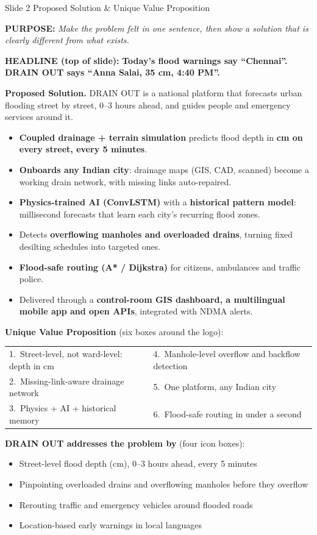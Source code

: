 \documentclass[11pt,a4paper]{article}
\newcommand{\purpose}[1]{\par{\small\color{ink!70}\textbf{PURPOSE:} \emph{#1}}\par\medskip}
\newcommand{\hookline}[1]{%
  \begin{tcolorbox}[colback=hook!6,colframe=hook,boxrule=0.6pt,arc=2pt,left=7pt,right=7pt,top=4pt,bottom=4pt]
  {\color{hook}\textbf{HEADLINE (top of slide):}} \textbf{#1}\end{tcolorbox}}
\newcommand{\slidepart}[2]{\par\smallskip{\color{#1}\textbf{#2}}\par\smallskip}
\newcommand{\onslide}{\slidepart{accent}{ON THE SLIDE}}
\begin{document}
\begin{slidebox}{Slide 2 \textendash{} Proposed Solution \& Unique Value Proposition}
\purpose{Make the problem felt in one sentence, then show a solution that is clearly
different from what exists.}
\hookline{Today's flood warnings say ``Chennai''. DRAIN OUT says ``Anna Salai, 35 cm, 4:40 PM''.}

\onslide
\textbf{Proposed Solution.} DRAIN OUT is a national platform that forecasts urban
flooding street by street, 0--3 hours ahead, and guides people and emergency services
around it.
\begin{itemize}
  \item \textbf{Coupled drainage + terrain simulation} predicts flood depth in
        \textbf{cm on every street, every 5 minutes}.
  \item \textbf{Onboards any Indian city}: drainage maps (GIS, CAD, scanned) become a
        working drain network, with missing links auto-repaired.
  \item \textbf{Physics-trained AI (ConvLSTM)} with a \textbf{historical pattern model}:
        millisecond forecasts that learn each city's recurring flood zones.
  \item Detects \textbf{overflowing manholes and overloaded drains}, turning fixed
        desilting schedules into targeted ones.
  \item \textbf{Flood-safe routing (A* / Dijkstra)} for citizens, ambulances and traffic police.
  \item Delivered through a \textbf{control-room GIS dashboard, a multilingual mobile app
        and open APIs}, integrated with NDMA alerts.
\end{itemize}

\textbf{Unique Value Proposition} (six boxes around the logo):
\begin{tabularx}{\linewidth}{@{}LL@{}}
1.\ Street-level, not ward-level: depth in cm & 4.\ Manhole-level overflow and backflow detection\\
2.\ Missing-link-aware drainage network & 5.\ One platform, any Indian city\\
3.\ Physics + AI + historical memory & 6.\ Flood-safe routing in under a second\\
\end{tabularx}

\textbf{DRAIN OUT addresses the problem by} (four icon boxes):
\begin{itemize}
  \item Street-level flood depth (cm), 0--3 hours ahead, every 5 minutes
  \item Pinpointing overloaded drains and overflowing manholes before they overflow
  \item Rerouting traffic and emergency vehicles around flooded roads
  \item Location-based early warnings in local languages
\end{itemize}


\end{slidebox}
\end{document}

